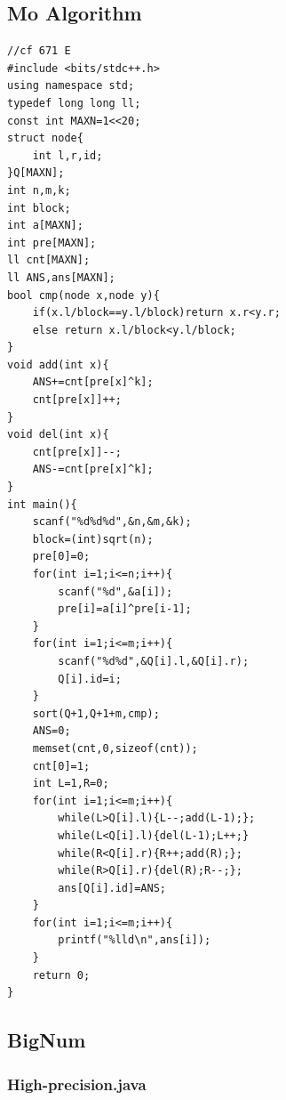 \documentclass[twoside]{article}
\begin{document}
\subsection{Mo Algorithm}
\begin{lstlisting}
//cf 671 E
#include <bits/stdc++.h>
using namespace std;
typedef long long ll;
const int MAXN=1<<20;
struct node{
    int l,r,id;
}Q[MAXN];
int n,m,k;
int block;
int a[MAXN];
int pre[MAXN];
ll cnt[MAXN];
ll ANS,ans[MAXN];
bool cmp(node x,node y){
    if(x.l/block==y.l/block)return x.r<y.r;
    else return x.l/block<y.l/block;
}
void add(int x){
    ANS+=cnt[pre[x]^k];
    cnt[pre[x]]++;
}
void del(int x){
    cnt[pre[x]]--;
    ANS-=cnt[pre[x]^k];
}
int main(){
    scanf("%d%d%d",&n,&m,&k);
    block=(int)sqrt(n);
    pre[0]=0;
    for(int i=1;i<=n;i++){
        scanf("%d",&a[i]);
        pre[i]=a[i]^pre[i-1];
    }
    for(int i=1;i<=m;i++){
        scanf("%d%d",&Q[i].l,&Q[i].r);
        Q[i].id=i;
    }
    sort(Q+1,Q+1+m,cmp);
    ANS=0;
    memset(cnt,0,sizeof(cnt));
    cnt[0]=1;
    int L=1,R=0;
    for(int i=1;i<=m;i++){
        while(L>Q[i].l){L--;add(L-1);};
        while(L<Q[i].l){del(L-1);L++;}
        while(R<Q[i].r){R++;add(R);};
        while(R>Q[i].r){del(R);R--;};
        ans[Q[i].id]=ANS;
    }
    for(int i=1;i<=m;i++){
        printf("%lld\n",ans[i]);
    }
    return 0;
}
\end{lstlisting}
\subsection{BigNum}
\subsubsection{High-precision.java}
\end{document}
